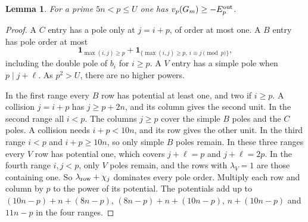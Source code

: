 \documentclass{amsart}
\newtheorem{lemma}{Lemma}[section]
\numberwithin{equation}{section}
\numberwithin{table}{section}
\begin{document}
\begin{lemma}\label{lem:outer-bound}
For a prime $5n<p\le U$ one has $v_p(G_m)\ge-E_p^{\rm out}$.
\end{lemma}
\begin{proof}
A $C$ entry has a pole only at $j=i+p$, of order at most one. A $B$ entry
has pole order at most
\[
 \mathbf1_{\max(i,j)\ge p}
 +\mathbf1_{\{\max(i,j)\ge p,\ i\equiv j\pmod p\}},
\]
including the double pole of $b_i$ for $i\ge p$. A $V$ entry has a simple
pole when $p\mid j+\ell$. As $p^2>U$, there are no higher powers.

In the first range every $B$ row has potential at least one, and two if
$i\ge p$. A collision $j=i+p$ has $j\ge p+2n$, and its column gives the
second unit. In the second range all $i<p$. The columns $j\ge p$ cover the
simple $B$ poles and the $C$ poles. A collision needs $i+p<10n$, and its
row gives the other unit. In the third range $i<p$ and $i+p\ge10n$, so
only simple $B$ poles remain. In these three ranges every $V$ row has
potential one, which covers $j+\ell=p$ and $j+\ell=2p$. In the fourth range
$i,j<p$, only $V$ poles remain, and the rows with $\lambda_V=1$ are those
containing one. So $\lambda_{\rm row}+\chi_j$ dominates every pole order.
Multiply each row and column by $p$ to the power of its potential. The
potentials add up to $(10n-p)+n+(8n-p)$, $(8n-p)+n+(10n-p)$, $n+(10n-p)$
and $11n-p$ in the four ranges.
\end{proof}
\end{document}
